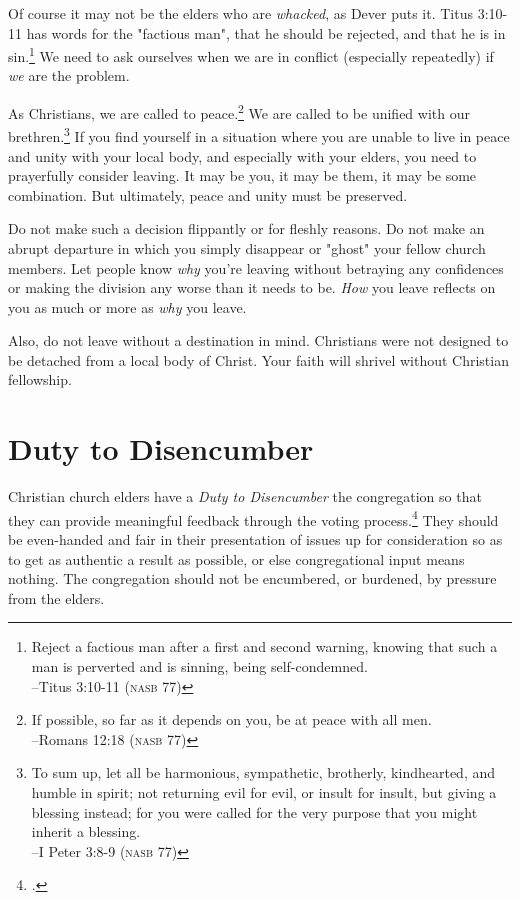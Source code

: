 Of course it may not be the elders who are \textit{whacked}, as Dever puts it.  Titus 3:10-11 has words for the "factious man", that he should be rejected, and that he is in sin.\footnote{Reject a factious man after a first and second warning, knowing that such a man is perverted and is sinning, being self-condemned. \\ \hspace*{\fill} --Titus 3:10-11 (\textsc{nasb 77})}  We need to ask ourselves when we are in conflict (especially repeatedly) if \textit{we} are the problem.

As Christians, we are called to peace.\footnote{If possible, so far as it depends on you, be at peace with all men.\\ \hspace*{\fill} --Romans 12:18 (\textsc{nasb 77})}  We are called to be unified with our brethren.\footnote{To sum up, let all be harmonious, sympathetic, brotherly, kindhearted, and humble in spirit; not returning evil for evil, or insult for insult, but giving a blessing instead; for you were called for the very purpose that you might inherit a blessing.\\ \hspace*{\fill} --I Peter 3:8-9 (\textsc{nasb 77})}  If you find yourself in a situation where you are unable to live in peace and unity with your local body, and especially with your elders, you need to prayerfully consider leaving.  It may be you, it may be them, it may be some combination.  But ultimately, peace and unity must be preserved.

Do not make such a decision flippantly or for fleshly reasons.  Do not make an abrupt departure in which you simply disappear or "ghost" your fellow church members.  Let people know \textit{why} you're leaving without betraying any confidences or making the division any worse than it needs to be.  \textit{How} you leave reflects on you as much or more as \textit{why} you leave.

Also, do not leave without a destination in mind.  Christians were not designed to be detached from a local body of Christ.  Your faith will shrivel without Christian fellowship.  

\ifdefined\embedversion\newpage\fi
\section{Duty to Disencumber}
Christian church elders have a \textit{Duty to Disencumber} the congregation so that they can provide meaningful feedback through the voting process.\footcite{strauch2024elderrelation}  They should be even-handed and fair in their presentation of issues up for consideration so as to get as authentic a result as possible, or else congregational input means nothing.  The congregation should not be encumbered, or burdened, by pressure from the elders.

